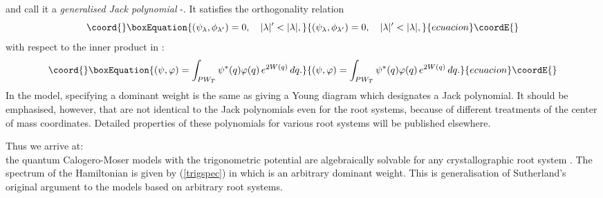 \documentclass[a4paper,12pt]{article}
\begin{document}
and call it a {\em generalised Jack polynomial\/}
\cite{Stan}-\cite{Awat}. It satisfies the orthogonality relation
\begin{equation}\coord{}\boxEquation{
(\psi_{\lambda},\phi_{\lambda^\prime})=0,\quad |\lambda|^\prime<
|\lambda|,
}{
(\psi_{\lambda},\phi_{\lambda^\prime})=0,\quad |\lambda|^\prime<
|\lambda|,
}{ecuacion}\coordE{}\end{equation}
with respect to the inner product in \coordHE{}:
\begin{equation}\coord{}\boxEquation{
(\psi,\varphi)=\int_{PW_T}\psi^*(q)\varphi(q)\,e^{2W(q)}\,dq.
}{
(\psi,\varphi)=\int_{PW_T}\psi^*(q)\varphi(q)\,e^{2W(q)}\,dq.
}{ecuacion}\coordE{}\end{equation}
In the \coordHE{} model, specifying a dominant weight \myHighlight{$\lambda$}\coordHE{} is the same
as giving a Young diagram which designates a Jack polynomial.
It should be emphasised, however, that \myHighlight{$\{\psi_{\lambda}\}$}\coordHE{} are not
identical to the Jack polynomials even for the \coordHE{} root systems,
because of  different
treatments of the center of mass coordinates.
 Detailed properties of these polynomials for
various root systems will be
published elsewhere.

\bigskip
Thus we arrive at:\\
the quantum Calogero-Moser models with the trigonometric potential  are
algebraically solvable for any crystallographic
root system \myHighlight{\(\Delta\)}\coordHE{}. The spectrum of the Hamiltonian \coordHE{}
is given by (\ref{trigspec})
in which \myHighlight{\(\lambda\)}\coordHE{} is an arbitrary dominant weight.
This is generalisation of Sutherland's original argument \cite{Sut} to
the models based on arbitrary root systems.
\end{document}
